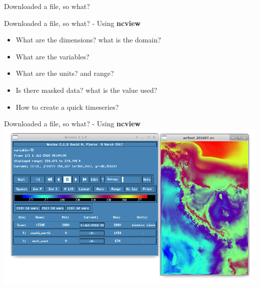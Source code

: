 \begin{frame}{\insertsectionnumber{ |} Downloaded a file, so what?}
\end{frame}

\begin{frame}{\insertsectionnumber{ |} Downloaded a file, so what? - Using \textbf{ncview}}
   \begin{itemize}
       \item What are the dimensions? what is the domain?
            \vspace{0.3cm}
       \item What are the variables?
            \vspace{0.3cm}
       \item What are the units? and range?
            \vspace{0.3cm}
       \item Is there masked data? what is the value used? 
            \vspace{0.3cm}
       \item How to create a quick timeseries?
   \end{itemize}
\end{frame}


\begin{frame}{\insertsectionnumber{ |} Downloaded a file, so what? - Using \textbf{ncview}}
    \includegraphics[scale=0.35]{images/wrf_RIS.png}\\
\end{frame}




